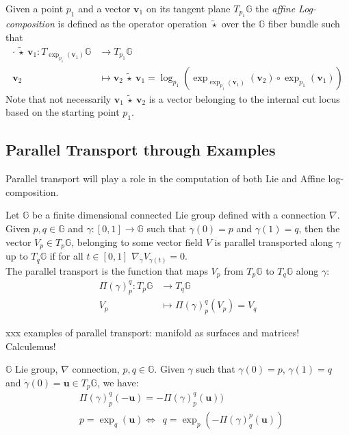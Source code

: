 Given a point $p_1$ and a vector $\mathbf{v}_{1}$ on its tangent plane $T_{p_1}\mathbb{G}$ the \emph{affine Log-composition} is defined as the operator operation $\tilde{\star} $ over the $\mathbb{G}$ fiber bundle such that 
\begin{align*}
\cdot ~ \tilde{\star} ~ \mathbf{v}_{1}  : T_{\exp_{p_1}(\mathbf{v}_{1})}\mathbb{G}  & \longrightarrow T_{p_1}\mathbb{G}   
\\
\mathbf{v}_{2}&\longmapsto \mathbf{v}_{2}~\tilde{\star}~ \mathbf{v}_{1}
=
\log_{p_1}(\exp_{\exp_{p_1}(\mathbf{v}_{1})}(\mathbf{v}_{2})\circ\exp_{p_1}(\mathbf{v}_{1}))
\end{align*}
Note that not necessarily $\mathbf{v}_{1}~\tilde{\star}~ \mathbf{v}_{2}$ is a vector belonging to the internal cut locus based on the starting point $p_{1}$.

\subsection{Parallel Transport through Examples}
Parallel transport will play a role in the computation of both Lie and Affine log-composition.
\begin{definition}
	Let $\mathbb{G}$ be a finite dimensional connected Lie group defined with a connection $\nabla$. Given $p,q \in \mathbb{G}$ and $\gamma : [0,1] \rightarrow \mathbb{G}$ such that $\gamma(0) = p$ and $\gamma(1) = q$, then the vector $V_{p} \in T_{p}\mathbb{G}$, belonging to some vector field $V$ is parallel transported along $\gamma$ up to $T_{q}\mathbb{G}$ if for all $t \in  [0,1]$ $\nabla_{\dot{\gamma}}V_{\gamma(t)} = 0$.\\
	The parallel transport is the function that maps $V_{p}$ from $T_{p}\mathbb{G}$ to $T_{q}\mathbb{G}$ along $\gamma$:
	\begin{align*}
	\Pi(\gamma)_{p}^{q} :  T_{p}\mathbb{G} & \longrightarrow T_{q}\mathbb{G}  \\
	V_{p}&\longmapsto \Pi(\gamma)_{p}^{q}(V_{p}) = V_{q}
	\end{align*}
\end{definition}

\noindent
xxx examples of parallel transport: manifold as surfaces and matrices! Calculemus!

\begin{prop}[Inversion]
	$\mathbb{G}$ Lie group, $\nabla$ connection, $p,q\in\mathbb{G}$. Given $\gamma$ such that $\gamma(0)= p$, $\gamma(1)=q$ and $\dot{\gamma}(0)=\mathbf{u}\in T_{p}\mathbb{G}$, we have:
	\begin{align}
	& \Pi(\gamma)_{p}^{q}(-\mathbf{u}) = -\Pi(\gamma)_{p}^{q}(\mathbf{u}) )\\
	& p = \exp_{q}(\mathbf{u}) \Longleftrightarrow \phantom{z} q = \exp_{p}(-\Pi(\gamma)_{q}^{p}(\mathbf{u}))
	\end{align}
\end{prop}

